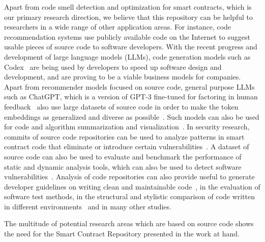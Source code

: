 \documentclass[10pt,conference]{IEEEtran}
\begin{document}
	Apart from code smell detection and optimization for smart contracts, which is our primary research direction, we believe that this repository can be helpful to researchers in a wide range of other application areas. For instance, code recommendation systems use publicly available code on the Internet to suggest usable pieces of source code to software developers. With the recent progress and development of large language models (LLMs), code generation models such as Codex~\cite{codex} are being used by developers to speed up software design and development, and are proving to be a viable business models for companies. Apart from recommender models focused on source code, general purpose LLMs such as ChatGPT, which is a version of GPT-3 fine-tuned for factoring in human feedback~\cite{chatgpt} also use large datasets of source code in order to make the token embeddings as generalized and diverse as possible~\cite{thestack}. Such models can also be used for code and algorithm summarization and visualization~\cite{codesummarization}. In security research, commits of source code repositories can be used to analyze patterns in smart contract code that eliminate or introduce certain vulnerabilities~\cite{securitydataset}. A dataset of source code can also be used to evaluate and benchmark the performance of static and dynamic analysis tools, which can also be used to detect software vulnerabilities~\cite{staticanalysis}. Analysis of code repositories can also provide useful to generate developer guidelines on writing clean and maintainable code~\cite{maintainablecode}, in the evaluation of software test methods\cite{testmethodevaluation}, in the structural and stylistic comparison of code written in different environments~\cite{codestylecomparison} and in many other studies. 
	
	The multitude of potential research areas which are based on source code shows the need for the Smart Contract Repository presented in the work at hand.
	
\end{document}
